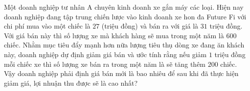 \begin{baitap}%
	Một doanh nghiệp tư nhân A chuyên kinh doanh xe gắn máy các loại. Hiện nay doanh nghiệp đang tập trung chiến lược vào kinh doanh xe hon đa Future Fi với chi phí mua vào một chiếc là $27$ (triệu đồng) và bán ra với giá là $31$ triệu đồng. Với giá bán này thì số lượng xe mà khách hàng sẽ mua trong một năm là $600$ chiếc. Nhằm mục tiêu đẩy mạnh hơn nữa lượng tiêu thụ dòng xe đang ăn khách này, doanh nghiệp dự định giảm giá bán và ước tính rằng nếu giảm $1$ triệu đồng mỗi chiếc xe thì số lượng xe bán ra trong một năm là sẽ tăng thêm $200$ chiếc. Vậy doanh nghiệp phải định giá bán mới là bao nhiêu để sau khi đã thực hiện giảm giá, lợi nhuận thu được sẽ là cao nhất?
\end{baitap}

